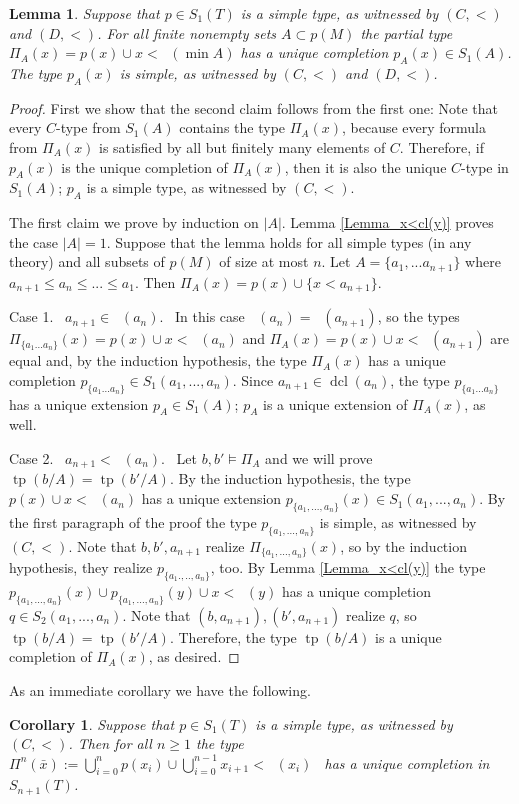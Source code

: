\documentclass[10pt,a4paper]{amsart}
\newtheorem{Lemma}[Theorem]{Lemma}
\newtheorem{Corollary}[Theorem]{Corollary}
\theoremstyle{definition}
\DeclareMathOperator{\cl}{cl_S}
\DeclareMathOperator{\dcl}{dcl}
\DeclareMathOperator{\tp}{tp}
\begin{document}
\begin{Lemma}\label{Lemma_cl_n}
Suppose that $p\in S_1(T)$ is a simple type, as witnessed by $(C,<)$ and $(D,<)$.
For all finite nonempty sets $A\subset p(M)$ the partial type $\Pi_A(x)=p(x)\cup x<\cl(\min A)$ has a unique completion $p_A(x)\in S_1(A)$.  The type $p_A(x)$ is simple, as witnessed by $(C,<)$ and $(D,<)$.
\end{Lemma}
\begin{proof}First we show that the second claim follows from the first one: Note that every $C$-type from $S_1(A)$ contains the type $\Pi_A(x)$, because every formula from $\Pi_A(x)$ is satisfied by all but finitely many elements of $C$. Therefore, if $p_A(x)$ is the unique completion of $\Pi_A(x)$, then it is also the unique $C$-type in $S_1(A)$;  $p_A$ is a simple type, as witnessed by $(C,<)$.


The first claim we prove by induction on $|A|$.  Lemma \ref{Lemma_x<cl(y)} proves the case $|A|=1$. 
Suppose that the lemma holds for all simple types (in any theory) and all subsets of $p(M)$  of size at most $n$. Let $A=\{a_1,...a_{n+1}\}$ where $a_{n+1}\leq a_n\leq ...\leq a_{1}$. Then $\Pi_A(x)=p(x)\cup\{x<a_{n+1}\}$. 

Case 1. \ $a_{n+1}\in \cl(a_n)$. \ In this case $\cl(a_n)=\cl(a_{n+1})$, so the types $\Pi_{\{a_1...a_n\}}(x)=p(x)\cup x<\cl(a_n)$ and $\Pi_{A}(x)=p(x)\cup x<\cl(a_{n+1})$ 
are equal and, by the induction hypothesis, the type $\Pi_A(x)$ has a unique completion $p_{\{a_1...a_n\}}\in S_1(a_1,...,a_n)$. Since 
$a_{n+1}\in \dcl(a_n)$, the type $p_{\{a_1...a_n\}}$ has a unique extension $p_A\in S_1(A)$; $p_A$  is a unique extension of $\Pi_A(x)$, as well.   

Case 2. \ $a_{n+1}<\cl(a_n)$. \ Let $b,b'\models \Pi_A$ and we will prove $\tp(b/A)=\tp(b'/A)$. By the induction hypothesis, the type $p(x)\cup x<\cl(a_n)$ has a unique extension $p_{\{a_1,...,a_n\}}(x)\in S_1(a_1,...,a_n)$. By the first paragraph of the proof the type  $p_{\{a_1,...,a_n\}} $ is  simple, as  witnessed by $(C,<)$. Note that $b,b',a_{n+1}$ realize $\Pi_{\{a_1,...,a_n\}}(x)$, so by the induction hypothesis, they realize $p_{\{a_1.,..,a_n\}}$, too. By Lemma \ref{Lemma_x<cl(y)}  the type $p_{\{a_1,...,a_n\}}(x)\cup p_{\{a_1,...,a_n\}}(y) \cup x<\cl(y)$ has a unique completion   $q\in S_2(a_1,...,a_n)$. Note that $(b,a_{n+1}), (b',a_{n+1})$ realize $q$, so  $\tp(b/A)=\tp(b'/A)$. Therefore, the type $\tp(b/A)$ is a  unique completion of $\Pi_A(x)$, as desired.
\end{proof}
As an immediate corollary we have the following.
\begin{Corollary}\label{Cor_pntypes}
Suppose that $p\in S_1(T)$ is a simple type, as witnessed by $(C,<)$. Then for all $n\geq 1$ the type 
 \ $\Pi^n(\bar x):=\bigcup_{i=0}^n p(x_i)\cup \bigcup_{i=0}^{n-1} x_{i+1}<\cl(x_i)$ \
has a unique completion in $S_{n+1}(T)$. 
\end{Corollary}
\end{document}
